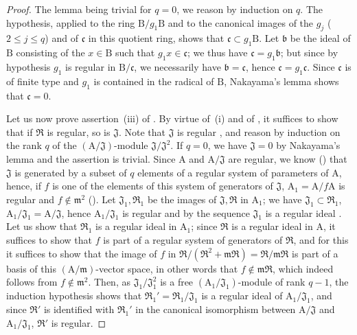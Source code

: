 \begin{proof}
The lemma being trivial for $q=0$, we reason by induction on $q$.
The hypothesis, applied to the ring $\mathrm{B}/g_1\mathrm{B}$ and to the canonical images of the $g_j$ ($2\leq j\leq q$)
and of $\mathfrak{c}$ in this quotient ring, shows that $\mathfrak{c}\subset g_1\mathrm{B}$.
Let $\mathfrak{b}$ be the ideal of $\mathrm{B}$ consisting of the $x\in\mathrm{B}$ such that $g_1 x\in\mathfrak{c}$; we thus have $\mathfrak{c}=g_1\mathfrak{b}$; but since by hypothesis $g_1$ is regular in $\mathrm{B}/\mathfrak{c}$, we necessarily have $\mathfrak{b}=\mathfrak{c}$, hence $\mathfrak{c}=g_1\mathfrak{c}$.
Since $\mathfrak{c}$ is of finite type and $g_1$ is contained in the radical of $\mathrm{B}$, Nakayama's lemma shows that $\mathfrak{c}=0$.

Let us now prove assertion~(iii) of .
By virtue of~(i) and of , it suffices to show that if $\mathfrak{R}$ is regular, so is $\mathfrak{J}$.
Note that $\mathfrak{J}$ is regular , and reason by induction on the rank $q$ of the $(\mathrm{A}/\mathfrak{J})$-module $\mathfrak{J}/\mathfrak{J}^2$.
If $q=0$, we have $\mathfrak{J}=0$ by Nakayama's lemma and the assertion is trivial.
Since $\mathrm{A}$ and $\mathrm{A}/\mathfrak{J}$ are regular, we know () that $\mathfrak{J}$ is generated by a subset of $q$ elements of a regular system of parameters of $\mathrm{A}$, hence, if $f$ is one of the elements of this system of generators of $\mathfrak{J}$, $\mathrm{A}_1=\mathrm{A}/f\mathrm{A}$ is regular and $f\notin\mathfrak{m}^2$ ().
Let $\mathfrak{J}_1,\mathfrak{R}_1$ be the images of $\mathfrak{J},\mathfrak{R}$ in $\mathrm{A}_1$; we have $\mathfrak{J}_1\subset\mathfrak{R}_1$, $\mathrm{A}_1/\mathfrak{J}_1=\mathrm{A}/\mathfrak{J}$, hence $\mathrm{A}_1/\mathfrak{J}_1$ is regular and by the sequence $\mathfrak{J}_1$ is a regular ideal .
Let us show that $\mathfrak{R}_1$ is a regular ideal in $\mathrm{A}_1$; since $\mathfrak{R}$ is a regular ideal in $\mathrm{A}$, it suffices to show that $f$ is part of a regular system of generators of $\mathfrak{R}$, and for this  it suffices to show that the image of $f$ in $\mathfrak{R}/(\mathfrak{R}^2+\mathfrak{m}\mathfrak{R})=\mathfrak{R}/\mathfrak{m}\mathfrak{R}$ is part of a basis of this $(\mathrm{A}/\mathfrak{m})$-vector space, in other words that $f\notin\mathfrak{m}\mathfrak{R}$, which indeed follows from $f\notin\mathfrak{m}^2$.
Then, as $\mathfrak{J}_1/\mathfrak{J}_1^2$ is a free $(\mathrm{A}_1/\mathfrak{J}_1)$-module of rank $q-1$, the induction hypothesis shows that $\mathfrak{R}_1'=\mathfrak{R}_1/\mathfrak{J}_1$ is a regular ideal of $\mathrm{A}_1/\mathfrak{J}_1$, and since $\mathfrak{R}'$ is identified with $\mathfrak{R}_1'$ in the canonical isomorphism between $\mathrm{A}/\mathfrak{J}$ and $\mathrm{A}_1/\mathfrak{J}_1$, $\mathfrak{R}'$ is regular.
\end{proof}

